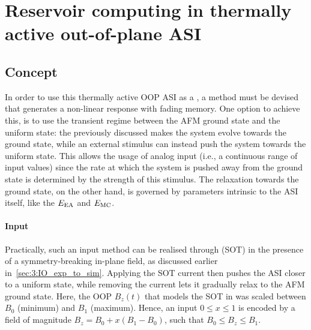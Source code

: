 \newpage
\section{Reservoir computing in thermally active out-of-plane ASI}
\subsection{Concept}
In order to use this thermally active OOP ASI as a , a method must be devised that generates a non-linear response with fading memory.
One option to achieve this, is to use the transient regime between the AFM ground state and the uniform state: the previously discussed  makes the system evolve towards the ground state, while an external stimulus can instead push the system towards the uniform state.
This allows the usage of analog input (i.e., a continuous range of input values) since the rate at which the system is pushed away from the ground state is determined by the strength of this stimulus.
The relaxation towards the ground state, on the other hand, is governed by parameters intrinsic to the ASI itself, like the  $E_\mathrm{EA}$ and  $E_\mathrm{MC}$.

\paragraph{Input}
Practically, such an input method can be realised through  (SOT) in the presence of a symmetry-breaking in-plane field, as discussed earlier in~\cref{sec:3:IO_exp_to_sim}.
Applying the SOT current then pushes the ASI closer to a uniform state, while removing the current lets it gradually relax to the AFM ground state.
Here, the OOP  $B_z(t)$ that models the SOT in \hotspice was scaled between $B_0$ (minimum) and $B_1$ (maximum).
Hence, an input $0 \leq x \leq 1$ is encoded by a field of magnitude $B_z = B_0 + x (B_1 - B_0)$, such that $B_0 \leq B_z \leq B_1$.

